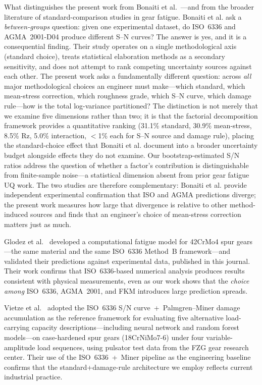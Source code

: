\documentclass[12pt,a4paper]{article}
\begin{document}
What distinguishes the present work from
Bonaiti et al.~\cite{bonaiti2024}---and from the broader literature of
standard-comparison studies in gear fatigue. Bonaiti et al. ask a
\emph{between-groups} question: given one experimental dataset, do
ISO~6336 and AGMA~2001-D04 produce different S--N curves? The answer is
yes, and it is a consequential finding. Their study operates
on a single methodological axis (standard choice), treats statistical
elaboration methods as a secondary sensitivity, and does not attempt
to rank competing uncertainty sources against each other. The present
work asks a fundamentally different question: across \emph{all} major
methodological choices an engineer must make---which standard, which
mean-stress correction, which roughness grade, which S--N curve, which
damage rule---how is the total log-variance partitioned? The distinction
is not merely that we examine five dimensions rather than two; it is
that the factorial decomposition framework provides a quantitative
ranking (31.1\% standard, 30.9\% mean-stress, 8.5\% Rz, 5.0\%
interaction, $<$1\% each for S--N source and damage rule), placing the
standard-choice effect that Bonaiti et al. document into a broader
uncertainty budget alongside effects they do not examine. Our
bootstrap-estimated S/N ratios address the question of whether a
factor's contribution is distinguishable from finite-sample noise---a
statistical dimension absent from prior gear fatigue UQ work. The two
studies are therefore complementary: Bonaiti et al. provide independent
experimental confirmation that ISO and AGMA predictions diverge; the
present work measures how large that divergence is relative to other
method-induced sources and finds that an engineer's choice of mean-stress
correction matters just as much.

Glodez et al.~\cite{glodez2002} developed a computational fatigue
model for 42CrMo4 spur gears---the same material and the same
ISO~6336 Method~B framework---and validated their predictions against
experimental data, published in this journal. Their work confirms that
ISO~6336-based numerical analysis produces results consistent with
physical measurements, even as our work shows that the \emph{choice
among} ISO~6336, AGMA~2001, and FKM introduces large prediction spreads.

Vietze et al.~\cite{vietze2024} adopted the ISO~6336 S/N curve~+~Palmgren--Miner
damage accumulation as the reference framework for evaluating five alternative
load-carrying capacity descriptions---including neural network and random forest
models---on case-hardened spur gears (18CrNiMo7-6) under four variable-amplitude
load sequences, using pulsator test data from the FZG gear research center.
Their use of the ISO~6336~+~Miner pipeline as the engineering baseline confirms
that the standard+damage-rule architecture we employ reflects current industrial
practice.
\end{document}

